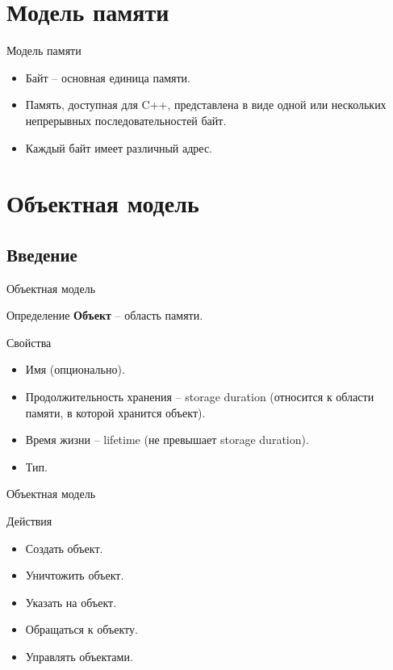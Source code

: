 


    
    \section{Модель памяти}
    \begin{frame}{Модель памяти}
        \begin{itemize}
            \item Байт -- основная единица памяти.
            \item Память, доступная для C++, представлена в виде одной или нескольких непрерывных последовательностей байт.
            \item Каждый байт имеет различный адрес.
        \end{itemize}
    \end{frame}
    \section{Объектная модель}
    \subsection{Введение}
    \begin{frame}{Объектная модель}
        \begin{block}{Определение}
            \textbf{Объект} -- область памяти.
        \end{block}
        \begin{block}{Свойства}
            \begin{itemize}
                \item Имя (опционально).
                \item Продолжительность хранения -- storage duration (относится к области памяти, в которой хранится объект).
                \item Время жизни -- lifetime (не превышает storage duration).
                \item Тип.
            \end{itemize}
        \end{block}
    \end{frame}
    \begin{frame}{Объектная модель}
        \begin{block}{Действия}
            \begin{itemize}
                \item Создать объект.
                \item Уничтожить объект.
                \item Указать на объект.
                \item Обращаться к объекту.
                \item Управлять объектами.
            \end{itemize}
        \end{block}
    \end{frame}
